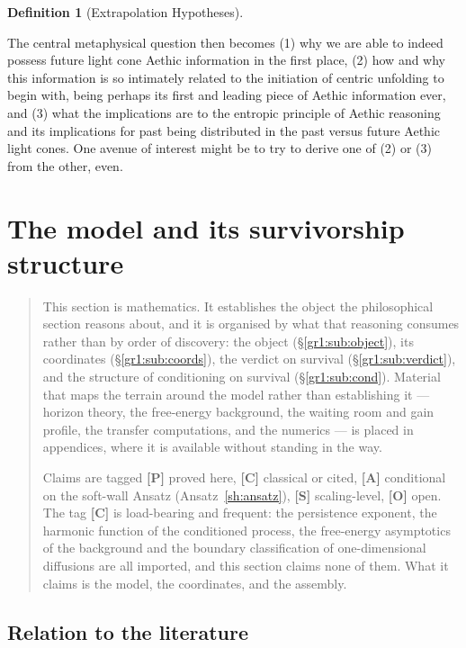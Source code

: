 \documentclass[11pt]{article}
\numberwithin{equation}{section}
\theoremstyle{plain}
\theoremstyle{definition}
\newtheorem{definition}[theorem]{Definition}
\theoremstyle{remark}
\begin{document}
\begin{definition}[Extrapolation Hypotheses]
\begin{itemize}
    The central metaphysical question then becomes (1) why we are able to indeed possess future light cone Aethic information in the first place, (2) how and why this information is so intimately related to the initiation of centric unfolding to begin with, being perhaps its first and leading piece of Aethic information ever, and (3) what the implications are to the entropic principle of Aethic reasoning and its implications for past being distributed in the past versus future Aethic light cones. One avenue of interest might be to try to derive one of (2) or (3) from the other, even. 
    \end{itemize}
\end{definition}

\section{The model and its survivorship structure}\label{gr1:sec}

\begin{quote}\small
This section is mathematics. It establishes the object the philosophical
section reasons about, and it is organised by what that reasoning
consumes rather than by order of discovery: the object
(\S\ref{gr1:sub:object}), its coordinates (\S\ref{gr1:sub:coords}), the
verdict on survival (\S\ref{gr1:sub:verdict}), and the structure of
conditioning on survival (\S\ref{gr1:sub:cond}). Material that maps the
terrain around the model rather than establishing it --- horizon theory,
the free-energy background, the waiting room and gain profile, the
transfer computations, and the numerics --- is placed in appendices,
where it is available without standing in the way.

Claims are tagged \textbf{[P]} proved here, \textbf{[C]} classical or
cited, \textbf{[A]} conditional on the soft-wall Ansatz
(Ansatz~\ref{sh:ansatz}), \textbf{[S]} scaling-level, \textbf{[O]}
open. The tag \textbf{[C]} is load-bearing and frequent: the persistence
exponent, the harmonic function of the conditioned process, the
free-energy asymptotics of the background and the boundary
classification of one-dimensional diffusions are all imported, and this
section claims none of them. What it claims is the model, the
coordinates, and the assembly.
\end{quote}

\subsection*{Relation to the literature}
\end{document}
